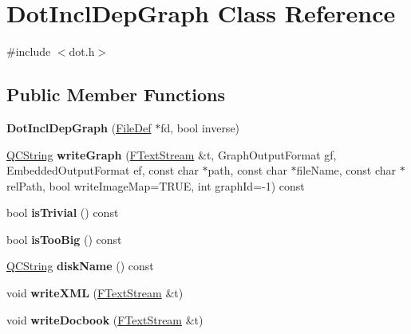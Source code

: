 \hypertarget{class_dot_incl_dep_graph}{}\section{Dot\+Incl\+Dep\+Graph Class Reference}
\label{class_dot_incl_dep_graph}


{\ttfamily \#include $<$dot.\+h$>$}

\subsection*{Public Member Functions}
\begin{DoxyCompactItemize}
\item 
\mbox{\label{class_dot_incl_dep_graph_a1cb9852930bcf289edd2e3ab54529cba}} 
{\bfseries Dot\+Incl\+Dep\+Graph} (\mbox{\hyperlink{class_file_def}{File\+Def}} $\ast$fd, bool inverse)
\item 
\mbox{\label{class_dot_incl_dep_graph_a376950ab033c06d2de801b3000f76034}} 
\mbox{\hyperlink{class_q_c_string}{Q\+C\+String}} {\bfseries write\+Graph} (\mbox{\hyperlink{class_f_text_stream}{F\+Text\+Stream}} \&t, Graph\+Output\+Format gf, Embedded\+Output\+Format ef, const char $\ast$path, const char $\ast$file\+Name, const char $\ast$rel\+Path, bool write\+Image\+Map=T\+R\+UE, int graph\+Id=-\/1) const
\item 
\mbox{\label{class_dot_incl_dep_graph_afe9784772becb74106aa3978a52105eb}} 
bool {\bfseries is\+Trivial} () const
\item 
\mbox{\label{class_dot_incl_dep_graph_ab00dfe31a3deec8e36ed043b0cd3be6f}} 
bool {\bfseries is\+Too\+Big} () const
\item 
\mbox{\label{class_dot_incl_dep_graph_a00b3a6cdc1fbbc725b862fd6f474eefc}} 
\mbox{\hyperlink{class_q_c_string}{Q\+C\+String}} {\bfseries disk\+Name} () const
\item 
\mbox{\label{class_dot_incl_dep_graph_a878fed6c8d534073d3f9f4a7dfdc23a3}} 
void {\bfseries write\+X\+ML} (\mbox{\hyperlink{class_f_text_stream}{F\+Text\+Stream}} \&t)
\item 
\mbox{\label{class_dot_incl_dep_graph_ac3aa273c0549ac56a52d0d7efadeb6e9}} 
void {\bfseries write\+Docbook} (\mbox{\hyperlink{class_f_text_stream}{F\+Text\+Stream}} \&t)
\end{DoxyCompactItemize}
